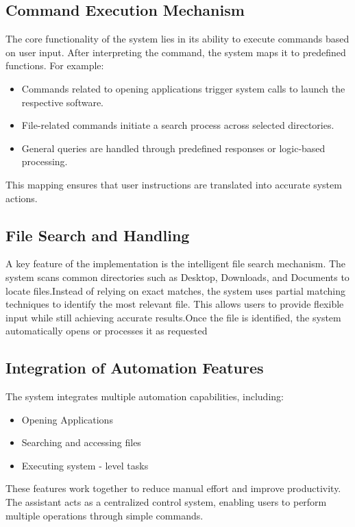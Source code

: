 \documentclass[conference]{IEEEtran}
\begin{document}
\subsection{Command Execution Mechanism}
\noindent
The core functionality of the system lies in its ability to execute commands based on user input. After interpreting the command, the system maps it to predefined functions. 
For example:

\begin{itemize}
    \item Commands related to opening applications trigger system calls to launch the respective software.
    \item File-related commands initiate a search process across selected directories.
    \item General queries are handled through predefined responses or logic-based processing.
\end{itemize}
\noindent
This mapping ensures that user instructions are translated into accurate system actions.


\subsection{File Search and Handling}
\noindent
A key feature of the implementation is the intelligent file search mechanism. The system scans common directories such as Desktop, Downloads, and Documents to locate files.Instead of relying on exact matches, the system uses partial matching techniques to identify the most relevant file. This allows users to provide flexible input while still achieving accurate results.Once the file is identified, the system automatically opens or processes it as requested

\subsection{Integration of Automation Features}
\noindent
The system integrates multiple automation capabilities, including:

\begin{itemize}
    \item Opening Applications
    \item Searching and accessing files
    \item Executing system - level tasks
\end{itemize}
\noindent
These features work together to reduce manual effort and improve productivity. The assistant acts as a centralized control system, enabling users to perform multiple operations through simple commands.
\end{document}
